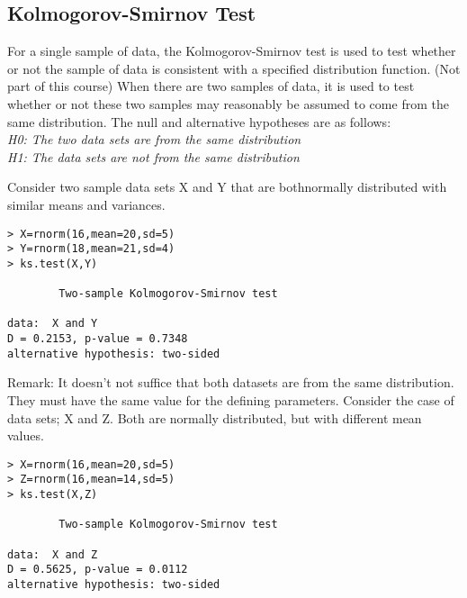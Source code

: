 

\subsection{Kolmogorov-Smirnov Test}

For a single sample of data, the Kolmogorov-Smirnov test is used to test whether or not the sample of data is consistent with a specified distribution function. (Not part of this course)
When there are two samples of data, it is used to test whether or not these two samples may reasonably be assumed to come from the same distribution.
The null and alternative hypotheses are as follows:\\
\emph{
H0: The two data sets are from the same distribution\\
H1: The data sets are not from the same distribution\\
}

Consider two sample data sets X and Y that are bothnormally distributed with similar means and variances.
\begin{framed}
\begin{verbatim}
> X=rnorm(16,mean=20,sd=5)
> Y=rnorm(18,mean=21,sd=4)
> ks.test(X,Y)

        Two-sample Kolmogorov-Smirnov test

data:  X and Y
D = 0.2153, p-value = 0.7348
alternative hypothesis: two-sided
\end{verbatim}
\end{framed}
Remark: It doesn’t not suffice that both datasets are from the same distribution. They must have the same value for the defining parameters. Consider the case of data sets; X and Z. Both are normally distributed, but with different mean values.
\begin{framed}
\begin{verbatim}
> X=rnorm(16,mean=20,sd=5)
> Z=rnorm(16,mean=14,sd=5)
> ks.test(X,Z)

        Two-sample Kolmogorov-Smirnov test

data:  X and Z
D = 0.5625, p-value = 0.0112
alternative hypothesis: two-sided
\end{verbatim}
\end{framed}

